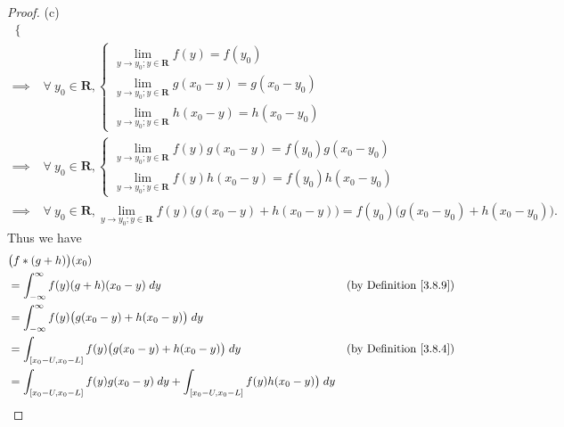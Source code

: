 \begin{proof}{(c)}
\begin{align*}
\begin{cases}
        \end{cases}                                                                                                 \\
        \implies & \forall\ y_0 \in \mathbf{R}, \begin{cases}
            \lim_{y \to y_0 ; y \in \mathbf{R}} f(y) = f(y_0)             \\
            \lim_{y \to y_0 ; y \in \mathbf{R}} g(x_0 - y) = g(x_0 - y_0) \\
            \lim_{y \to y_0 ; y \in \mathbf{R}} h(x_0 - y) = h(x_0 - y_0)
        \end{cases}                                                                                                 \\
        \implies & \forall\ y_0 \in \mathbf{R}, \begin{cases}
            \lim_{y \to y_0 ; y \in \mathbf{R}} f(y) g(x_0 - y) = f(y_0) g(x_0 - y_0) \\
            \lim_{y \to y_0 ; y \in \mathbf{R}} f(y) h(x_0 - y) = f(y_0) h(x_0 - y_0)
        \end{cases}                                                                                                 \\
        \implies & \forall\ y_0 \in \mathbf{R}, \lim_{y \to y_0 ; y \in \mathbf{R}} f(y) \big(g(x_0 - y) + h(x_0 - y)\big) = f(y_0) \big(g(x_0 - y_0) + h(x_0 - y_0)\big).
    \end{align*}
    Thus we have
    \begin{align*}
         & \big(f * (g + h)\big)(x_0)                                                                                                                    \\
         & = \int_{-\infty}^\infty f(y) (g + h)(x_0 - y) \; dy                                                      & \text{(by Definition \ref{3.8.9})} \\
         & = \int_{-\infty}^\infty f(y) \big(g(x_0 - y) + h(x_0 - y)\big) \; dy                                                                          \\
         & = \int_{[x_0 - U, x_0 - L]} f(y) \big(g(x_0 - y) + h(x_0 - y)\big) \; dy                                 & \text{(by Definition \ref{3.8.4})} \\
         & = \int_{[x_0 - U, x_0 - L]} f(y) g(x_0 - y) \; dy + \int_{[x_0 - U, x_0 - L]} f(y) h(x_0 - y)\big) \; dy                                      \\

\end{align*}
\end{proof}
